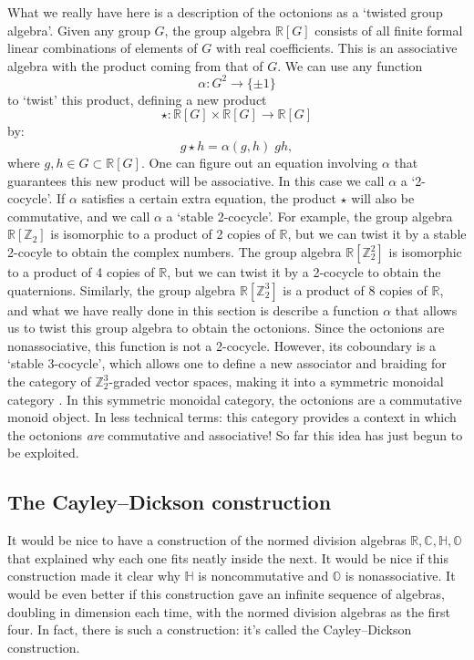 \documentclass[12pt]{article}
\newcommand\Z{{\mathbb Z}}
\newcommand\R{{\mathbb R}}
\newcommand\C{{\mathbb C}}
\renewcommand\H{{\mathbb H}}
\renewcommand\O{{\mathbb O}}
\newcommand{\maps}{\colon}
\begin{document}
What we really have here is a description of the octonions as a
`twisted group algebra'.  Given any group $G$, the group algebra   
$\R[G]$ consists of all finite formal linear combinations of elements   
of $G$ with real coefficients.  This is an associative algebra with   
the product coming from that of $G$.  We can use any function    
\[       \alpha \maps G^2 \to \{ \pm 1 \}     \]   
to `twist' this product, defining a new product   
\[       \star \maps \R[G] \times \R[G] \to \R[G]  \]   
by:   
\[       g \star h = \alpha(g,h) \; gh,  \]   
where $g,h \in G \subset \R[G]$.  One can figure out an equation    
involving $\alpha$ that guarantees this new product will be associative.   
In this case we call $\alpha$ a `2-cocycle'.   If $\alpha$ satisfies  a   
certain extra equation, the product $\star$ will also be commutative,   
and we call $\alpha$ a `stable 2-cocycle'.  For example, the group   
algebra  $\R[\Z_2]$ is isomorphic to a product of 2 copies of $\R$,    
but we can twist it by a stable 2-cocyle to obtain the complex numbers.     
The group algebra $\R[\Z_2^2]$ is isomorphic to a product of 4 copies    
of $\R$, but we can twist it by a 2-cocycle to obtain the quaternions.      
Similarly, the group algebra $\R[\Z_2^3]$ is a product of 8 copies of $\R$,    
and what we have really done in this section is describe a function   
$\alpha$ that allows us to twist this group algebra to obtain the   
octonions.  Since the octonions are nonassociative, this function is   
not a 2-cocycle.  However, its coboundary is a `stable 3-cocycle', which  
allows one to define a new associator and braiding for the category of  
$\Z_2^3$-graded vector spaces, making it into a symmetric monoidal  
category \cite{AM}.  In this symmetric monoidal category, the octonions  
are a commutative monoid object.  In less technical terms: this category 
provides a context in which the octonions {\it are} commutative and 
associative!  So far this idea has just begun to be exploited. 
   
\subsection{The Cayley--Dickson construction}  \label{cayley-dickson}   
   
It would be nice to have a construction of the normed division algebras   
$\R,\C,\H,\O$ that explained why each one fits neatly inside the next.   
It would be nice if this construction made it clear why $\H$ is   
noncommutative and $\O$ is nonassociative.  It would be even better if   
this construction gave an infinite sequence of algebras, doubling in   
dimension each time, with the normed division algebras as the first   
four.  In fact, there is such a construction: it's called the   
Cayley--Dickson construction.   
   
\end{document}
